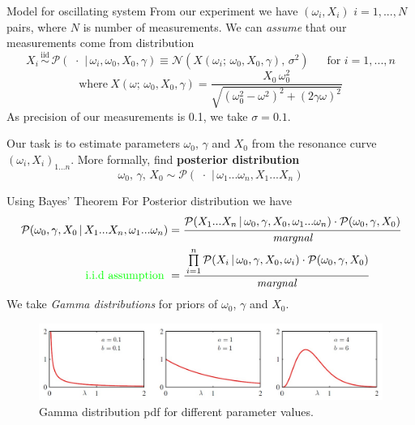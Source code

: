 \begin{frame}{Model for oscillating system}
From our experiment we have $(\omega_i, X_i)$ $i=1,...,N$ pairs, where $N$ is number of measurements. We can \textit{assume} that our measurements come from distribution
  \begin{equation*}\label{eq:distribution}
  X_i \, \overset{\text{iid}}{\sim} \,  
  \mathcal{P}(\,\, \cdot \,\, | \, \omega_i, \omega_0, X_0, \gamma) \equiv \mathcal{N}(X(\omega_i; \, \omega_0, X_0, \gamma),\,\sigma^{2})\ \quad 
  \text{   for   } i=1,...,n
  \end{equation*}
  \begin{equation*}\label{eq:solution-amplitude-new}
  \text{where} \ X(\omega; \, \omega_0, X_0, \gamma) = \frac{X_0 \, \omega_0^2} {\sqrt{(\omega_0^2-\omega^2)^2+(2 \gamma \omega)^2}}
  \end{equation*}
  \pause
  As precision of our measurements is 0.1, we take $\sigma = 0.1$.
  
  Our task is to estimate parameters $\omega_0,\, \gamma$ and $X_0$ from the resonance curve $(\omega_i, X_i)_{1...n}$. More formally, find \textbf{posterior distribution}
  \begin{equation}\label{eq:inference1}
  \omega_0, \, \gamma, \, X_0 \sim \mathcal{P}(\,\, \cdot \,\, | \, \omega_1...\omega_n, X_1...X_n)
  \end{equation}
\end{frame}

\begin{frame}{Using Bayes' Theorem}
For Posterior distribution we have
\begin{align*}
  \begin{split}
  \mathcal{P}(\omega_0, \gamma,X_0\,|\,X_1...X_n, \omega_1...\omega_n) &=
  \cfrac{\mathcal{P}(X_1...X_n\,|\,\omega_0,\gamma,X_0,\omega_1...\omega_n) \cdot
  	\mathcal{P}(\omega_0,\gamma,X_0)
  }{\textit{margnal}} \\
\textcolor{green}{\text{i.i.d assumption} \ }&= \cfrac{\prod\limits_{i=1}^{n}\mathcal{P}(X_i\,|\,\omega_0,\gamma,X_0, \omega_i) \cdot
	\mathcal{P}(\omega_0,\gamma,X_0)
}{\textit{margnal}}
\end{split}
\end{align*}
\pause
We take \textit{Gamma distributions} for priors of $\omega_0$, $\gamma$ and $X_0$. 

\begin{figure}
	\centering
	\includegraphics[width=\linewidth]{images/gamma.jpg}
	\caption{Gamma distribution pdf for different parameter values.}
\end{figure}
\end{frame}

